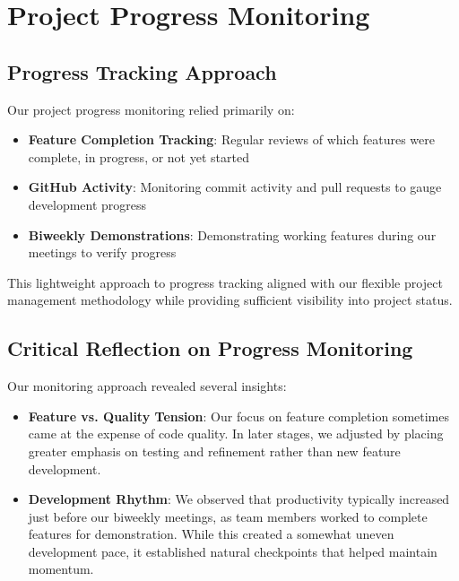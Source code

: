 \section{Project Progress Monitoring}

\subsection{Progress Tracking Approach}

Our project progress monitoring relied primarily on:

\begin{itemize}
    \item \textbf{Feature Completion Tracking}: Regular reviews of which features were complete, in progress, or not yet started
    
    \item \textbf{GitHub Activity}: Monitoring commit activity and pull requests to gauge development progress
    
    \item \textbf{Biweekly Demonstrations}: Demonstrating working features during our meetings to verify progress
\end{itemize}

This lightweight approach to progress tracking aligned with our flexible project management methodology while providing sufficient visibility into project status.

\subsection{Critical Reflection on Progress Monitoring}

Our monitoring approach revealed several insights:

\begin{itemize}
    \item \textbf{Feature vs. Quality Tension}: Our focus on feature completion sometimes came at the expense of code quality. In later stages, we adjusted by placing greater emphasis on testing and refinement rather than new feature development.
    
    \item \textbf{Development Rhythm}: We observed that productivity typically increased just before our biweekly meetings, as team members worked to complete features for demonstration. While this created a somewhat uneven development pace, it established natural checkpoints that helped maintain momentum.
   
\end{itemize}

